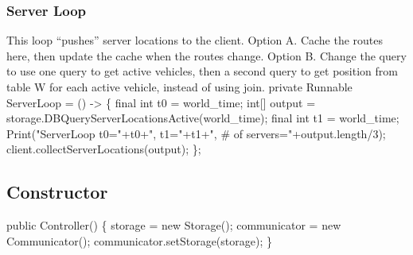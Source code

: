 \documentclass{article}
\def\nwendcode{\endtrivlist \endgroup}      %
\let\nwdocspar=\par
\begin{document}
\subsubsection{Server Loop}
This loop ``pushes'' server locations to the client.
Option A. Cache the routes here, then update the cache when the routes change.
Option B. Change the query to use one query to get active vehicles, then
  a second query to get position from table W for each active vehicle, instead
  of using join.
\nwenddocs{}\endmoddef{}
private Runnable ServerLoop = () -> \{
  final int t0 = world_time;
  int[] output = storage.DBQueryServerLocationsActive(world_time);
  final int t1 = world_time;
  Print("ServerLoop t0="+t0+", t1="+t1+", # of servers="+output.length/3);
  client.collectServerLocations(output);
\};
\eatline
{}\nwendcode{}\nwdocspar
\subsection{Constructor}
\nwenddocs{}\endmoddef{}
public Controller() \{
  storage = new Storage();
  communicator = new Communicator();
  communicator.setStorage(storage);
\}
\nwendcode{}\nwdocspar
\end{document}
